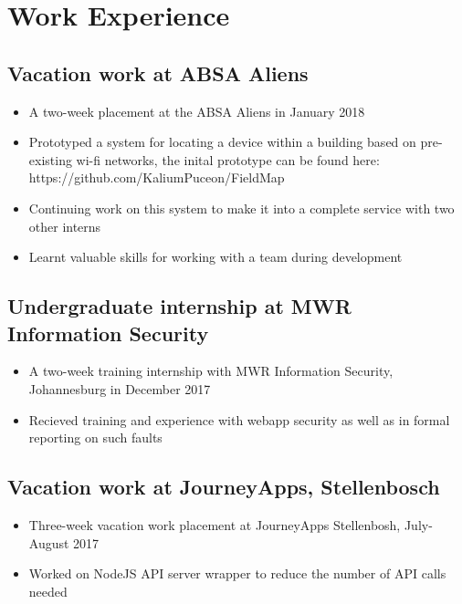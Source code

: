 \documentclass[12pt,a4paper,notitlepage]{article}
\begin{document}
\section*{Work Experience}

\subsection*{Vacation work at ABSA Aliens}
\begin{itemize}
    \item A two-week placement at the ABSA Aliens in January 2018
    \item Prototyped a system for locating a device within a building based on pre-existing wi-fi networks, the inital prototype can be found here:\\https://github.com/KaliumPuceon/FieldMap
    \item Continuing work on this system to make it into a complete service with two other interns
    \item Learnt valuable skills for working with a team during development
\end{itemize}

\subsection*{Undergraduate internship at MWR Information Security}
\begin{itemize}
    \item A two-week training internship with MWR Information Security, Johannesburg in December 2017
    \item Recieved training and experience with webapp security as well as in formal reporting on such faults
\end{itemize}

\subsection*{Vacation work at JourneyApps, Stellenbosch}
\begin{itemize}
    \item Three-week vacation work placement at JourneyApps Stellenbosh, July-August 2017
    \item Worked on NodeJS API server wrapper to reduce the number of API calls needed
\end{itemize}
\end{document}
